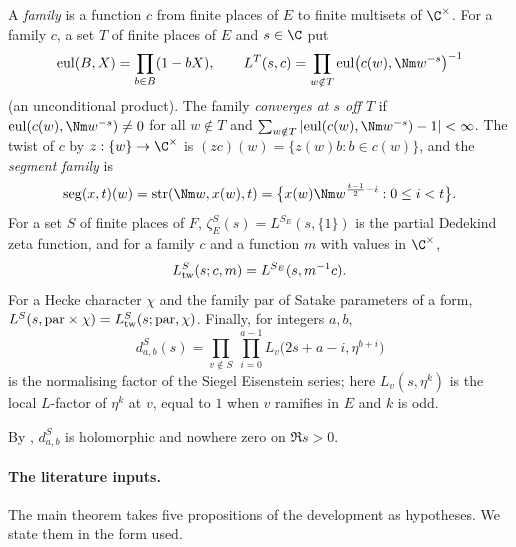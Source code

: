 \begin{definition}\label{pf:liftinj:Ldef}
A \emph{family} is a function $c$ from finite places of $E$ to finite multisets of $\C^\times$. For a family $c$, a set $T$ of finite places
of $E$ and $s\in\C$ put
\[
\mathrm{eul}(B,X)=\prod_{b\in B}(1-bX),\qquad L^T(s,c)=\prod_{w\notin T}\mathrm{eul}\bigl(c(w),\Nm w^{-s}\bigr)^{-1}
\]
(an unconditional product). The family \emph{converges at $s$ off $T$} if $\mathrm{eul}(c(w),\Nm w^{-s})\ne0$ for all $w\notin T$ and
$\sum_{w\notin T}|\mathrm{eul}(c(w),\Nm w^{-s})-1|<\infty$. The twist of $c$ by $z:\{w\}\to\C^\times$ is $(zc)(w)=\{z(w)b:b\in c(w)\}$, and
the \emph{segment family} is
\begin{equation}\label{eq:pf:liftinj:seg}
\mathrm{seg}(x,t)(w)=\liftinjstr(\Nm w,x(w),t)=\bigl\{x(w)\Nm w^{\frac{t-1}2-i}:0\le i<t\bigr\}.
\end{equation}
For a set $S$ of finite places of $F$, $\zeta^S_E(s)=L^{S_E}(s,\{1\})$ is the partial Dedekind zeta function, and for a family $c$ and a
function $m$ with values in $\C^\times$,
\begin{equation}\label{eq:pf:liftinj:LStw}
L^{S}_{\mathrm{tw}}(s;c,m)=L^{S_E}(s,m^{-1}c).
\end{equation}
For a Hecke character $\chi$ and the family $\mathrm{par}$ of Satake parameters of a form,
$L^S(s,\mathrm{par}\times\chi)=L^{S}_{\mathrm{tw}}(s;\mathrm{par},\chi)$. Finally, for integers $a,b$,
\begin{equation}\label{eq:pf:liftinj:dS}
d^S_{a,b}(s)=\prod_{v\notin S}\ \prod_{i=0}^{a-1}L_v\bigl(2s+a-i,\eta^{b+i}\bigr)
\end{equation}
is the normalising factor of the Siegel Eisenstein series; here $L_v(s,\eta^k)$ is the local $L$-factor of $\eta^k$ at $v$, equal to $1$
when $v$ ramifies in $E$ and $k$ is odd.
\end{definition}

By , $d^S_{a,b}$ is holomorphic and nowhere zero on $\Re s>0$.

\paragraph{The literature inputs.}
The main theorem takes five propositions of the development as hypotheses. We state them in the form used.

